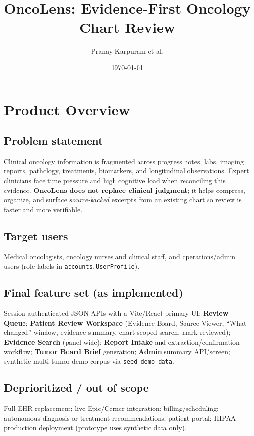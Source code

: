 \documentclass[11pt]{article}
\title{OncoLens: Evidence-First Oncology Chart Review}
\author{Pranay Karpuram et al.}
\date{\today}
\begin{document}
\maketitle

\section{Product Overview}

\subsection{Problem statement}
Clinical oncology information is fragmented across progress notes, labs, imaging reports, pathology, treatments, biomarkers, and longitudinal observations. Expert clinicians face time pressure and high cognitive load when reconciling this evidence. \textbf{OncoLens does not replace clinical judgment}; it helps compress, organize, and surface \emph{source-backed} excerpts from an existing chart so review is faster and more verifiable.

\subsection{Target users}
Medical oncologists, oncology nurses and clinical staff, and operations/admin users (role labels in \texttt{accounts.UserProfile}).

\subsection{Final feature set (as implemented)}
Session-authenticated JSON APIs with a Vite/React primary UI: \textbf{Review Queue}; \textbf{Patient Review Workspace} (Evidence Board, Source Viewer, ``What changed'' window, evidence summary, chart-scoped search, mark reviewed); \textbf{Evidence Search} (panel-wide); \textbf{Report Intake} and extraction/confirmation workflow; \textbf{Tumor Board Brief} generation; \textbf{Admin} summary API/screen; synthetic multi-tumor demo corpus via \texttt{seed\_demo\_data}.

\subsection{Deprioritized / out of scope}
Full EHR replacement; live Epic/Cerner integration; billing/scheduling; autonomous diagnosis or treatment recommendations; patient portal; HIPAA production deployment (prototype uses synthetic data only).
\end{document}
